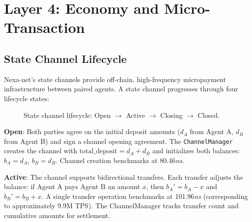 \section{Layer 4: Economy and Micro-Transaction}

\subsection{State Channel Lifecycle}

Nexa-net's state channels provide off-chain, high-frequency micropayment infrastructure between paired agents. A state channel progresses through four lifecycle states:

\begin{figure}[t]
\centering
{}
\caption{State channel lifecycle: Open $\rightarrow$ Active $\rightarrow$ Closing $\rightarrow$ Closed.}
\label{fig:channel-lifecycle}
\end{figure}

\textbf{Open}: Both parties agree on the initial deposit amounts ($d_A$ from Agent A, $d_B$ from Agent B) and sign a channel opening agreement. The \texttt{ChannelManager} creates the channel with $\text{total\_deposit} = d_A + d_B$ and initializes both balances: $b_A = d_A$, $b_B = d_B$. Channel creation benchmarks at 80.46\textit{ns}.

\textbf{Active}: The channel supports bidirectional transfers. Each transfer adjusts the balance: if Agent A pays Agent B an amount $x$, then $b_A' = b_A - x$ and $b_B' = b_B + x$. A single transfer operation benchmarks at 101.96\textit{ns} (corresponding to approximately 9.9M TPS). The ChannelManager tracks transfer count and cumulative amounts for settlement.

